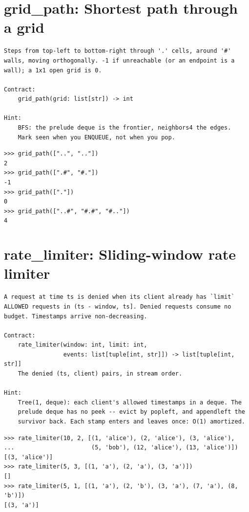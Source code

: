 \documentclass[10pt,letterpaper]{book}
\begin{document}
\section{grid\_path: Shortest path through a grid}
\begin{lstlisting}[style=ex]
Steps from top-left to bottom-right through '.' cells, around '#'
walls, moving orthogonally. -1 if unreachable (or an endpoint is a
wall); a 1x1 open grid is 0.

Contract:
    grid_path(grid: list[str]) -> int

Hint:
    BFS: the prelude deque is the frontier, neighbors4 the edges.
    Mark seen when you ENQUEUE, not when you pop.
\end{lstlisting}
\begin{lstlisting}[style=ex]
>>> grid_path(["..", ".."])
2
>>> grid_path([".#", "#."])
-1
>>> grid_path(["."])
0
>>> grid_path(["..#", "#.#", "#.."])
4
\end{lstlisting}

\section{rate\_limiter: Sliding-window rate limiter}
\begin{lstlisting}[style=ex]
A request at time ts is denied when its client already has `limit`
ALLOWED requests in (ts - window, ts]. Denied requests consume no
budget. Timestamps arrive non-decreasing.

Contract:
    rate_limiter(window: int, limit: int,
                 events: list[tuple[int, str]]) -> list[tuple[int, str]]
    The denied (ts, client) pairs, in stream order.

Hint:
    Tree(1, deque): each client's allowed timestamps in a deque. The
    prelude deque has no peek -- evict by popleft, and appendleft the
    survivor back. Each stamp enters and leaves once: O(1) amortized.
\end{lstlisting}
\begin{lstlisting}[style=ex]
>>> rate_limiter(10, 2, [(1, 'alice'), (2, 'alice'), (3, 'alice'),
...                      (5, 'bob'), (12, 'alice'), (13, 'alice')])
[(3, 'alice')]
>>> rate_limiter(5, 3, [(1, 'a'), (2, 'a'), (3, 'a')])
[]
>>> rate_limiter(5, 1, [(1, 'a'), (2, 'b'), (3, 'a'), (7, 'a'), (8, 'b')])
[(3, 'a')]
\end{lstlisting}
\end{document}
